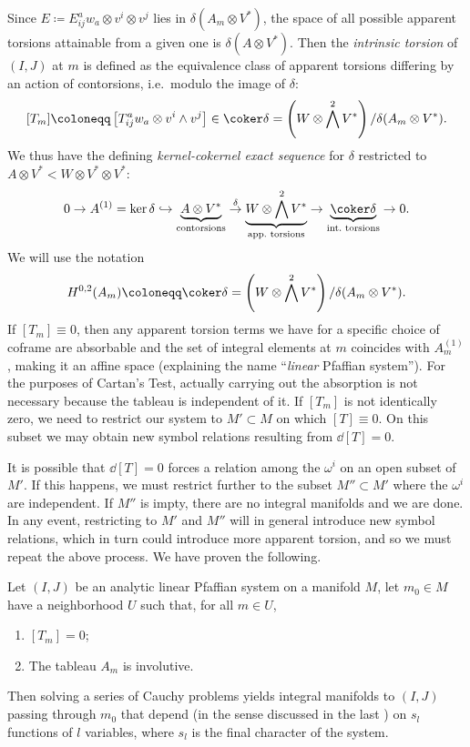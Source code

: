 Since $E\coloneqq E^a_{ij}w_a\otimes v^i\otimes v^j$ lies in $\delta(A_m\otimes V^\ast)$, the space of all possible apparent torsions attainable from a given one is $\delta(A\otimes V^\ast)$. Then the \emph{intrinsic torsion} of $(I,J)$ at $m$ is defined as the equivalence class of apparent torsions differing by an action of contorsions, i.e.\ modulo the image of $\delta$:
\[[T_m]\coloneqq \left[T^a_{ij}w_a\otimes v^i\wedge v^j\right]\in \coker\delta =\left(W\otimes \bigwedge^2 V^\ast\right)\slash \delta(A_m\otimes V^\ast).\]
We thus have the defining \emph{kernel-cokernel exact sequence} for $\delta$ restricted to $A\otimes V^\ast<W\otimes V^\ast\otimes V^\ast$:
\[0\to A^{(1)}=\ker\delta \hookrightarrow \underbrace{A\otimes V^\ast}_{\text{contorsions}}\overset{\delta}{\to}\underbrace{W\otimes\bigwedge^2 V^\ast}_{\text{app.\ torsions}}\to \underbrace{\coker\delta}_{\text{int.\ torsions}}\to 0.\]
We will use the notation 
\[H^{0,2}(A_m)\coloneqq \coker\delta=\left(W\otimes \bigwedge^2V^\ast\right)\slash \delta(A_m\otimes V^\ast).\]
If $[T_m]\equiv 0$, then any apparent torsion terms we have for a specific choice of coframe are absorbable and the set of integral elements at $m$ coincides with $A^{(1)}_m$, making it an affine space (explaining the name ``\emph{linear} Pfaffian system''). For the purposes of Cartan's Test, actually carrying out the absorption is not necessary because the tableau is independent of it. If $[T_m]$ is not identically zero, we need to restrict our system to $M'\subset M$ on which $[T]\equiv 0$. On this subset we may obtain new symbol relations resulting from $\dd [T]=0$.

It is possible that $\dd[T]=0$ forces a relation among the $\omega^i$ on an open subset of $M'$. If this happens, we must restrict further to the subset $M''\subset M'$ where the $\omega^i$ are independent. If $M''$ is impty, there are no integral manifolds and we are done. In any event, restricting to $M'$ and $M''$ will in general introduce new symbol relations, which in turn could introduce more apparent torsion, and so we must repeat the above process. We have proven the following.

\begin{thm}\label{thm 6.5.6 Ivey}
    Let $(I,J)$ be an analytic linear Pfaffian system on a manifold $M$, let $m_0\in M$ have a neighborhood $U$ such that, for all $m\in U$,
    \begin{enumerate}
        \item $[T_m]=0$;
        \item The tableau $A_m$ is involutive.
    \end{enumerate}
    Then solving a series of Cauchy problems yields integral manifolds to $(I,J)$ passing through $m_0$ that depend (in the sense discussed in the last \subsect) on $s_l$ functions of $l$ variables, where $s_l$ is the final character of the system.
\end{thm}

